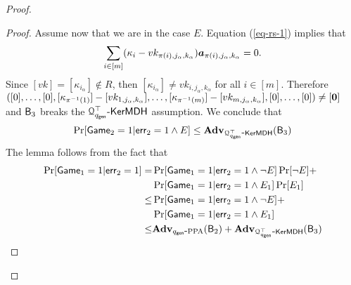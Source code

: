 \begin{proof}
\begin{proof}
Assume now that we are in the case $E$. Equation (\ref{eq-rs-1}) implies that
\begin{align*}
\sum_{i\in[m]}(\kappa_i-vk_{\pi(i),j_\alpha,k_\alpha}){\boldsymbol{a}}_{\pi(i),j_\alpha,k_\alpha}=0.
\end{align*}
Since $[vk]=[\kappa_{i_\alpha}]\notin R$, then $[\kappa_{i_\alpha}]\neq vk_{i,j_\alpha,k_\alpha}$ for all $i\in[m]$. Therefore $([0],\ldots,[0],\allowbreak [\kappa_{\pi^{-1}(1)}]-[vk_{1,j_\alpha,k_\alpha}],\ldots,[\kappa_{\pi^{-1}(m)}]-[vk_{m,j_\alpha,k_\alpha}],[0],\ldots,[0])\neq [{\boldsymbol{0}}]$ and $\mathsf{B}_3$ breaks the $\mathcal{Q}_{q_\mathsf{gen}}^\top\mbox{-}\allowbreak \mathsf{KerMDH}$ assumption. We conclude that
$$\Pr[\mathsf{Game}_2=1|\mathsf{err}_2=1\wedge E]\leq\mathbf{Adv}_{\mathcal{Q}^\top_{q_\mathsf{gen}}\mbox{-}\mathsf{KerMDH}}(\mathsf{B}_3)$$
The lemma follows from the fact that
\begin{align*}
\Pr[\mathsf{Game}_1=1|\mathsf{err}_2=1]=&\Pr[\mathsf{Game}_1=1|\mathsf{err}_2=1\wedge\neg E]\Pr[\neg E]+\\
&\Pr[\mathsf{Game}_1=1|\mathsf{err}_2=1\wedge{E}_1]\Pr[{E}_1]\\
\leq & \Pr[\mathsf{Game}_1=1|\mathsf{err}_2=1\wedge\neg E]+\\
&\Pr[\mathsf{Game}_1=1|\mathsf{err}_2=1\wedge{E}_1]\\
\leq & \mathbf{Adv}_{{q_\mathsf{gen}}\mbox{-}\mathrm{PPA}}(\mathsf{B}_2)+\mathbf{Adv}_{\mathcal{Q}^\top_{q_\mathsf{gen}}\mbox{-}\mathsf{KerMDH}}(\mathsf{B}_3)
\end{align*}
\end{proof}


\end{proof}

